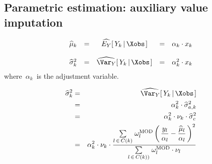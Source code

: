 
\subsection{Parametric estimation: auxiliary value imputation}

\begin{equation*}
\begin{array}{ccccc}
\widehat{\mu}_{k}
& = &
    \widehat{E_{Y}}\!\left[\,Y_{k}\left\vert\,\Xobs\right.\right]
& = &
    \alpha_{k} \cdot x_{k}
\\ \\
\widehat{\sigma}_{k}^{2}
& = &
    \widehat{\Var_{Y}}\!\left[\,Y_{k}\left\vert\,\Xobs\right.\right]
& = &
    \alpha_{k}^{2} \cdot x_{k}
\end{array}
\end{equation*}
where
\,$\alpha_{k}$\, is the adjustment variable.

\begin{eqnarray*}
\widehat{\sigma}_{k}^{2}
& = &
    \widehat{\Var_{Y}}\!\left[\,Y_{k}\left\vert\,\Xobs\right.\right]
\\
& = &
    \alpha_{k}^{2}\cdot\widehat{\sigma}_{a,k}^{2}
\\
& = &
    \alpha_{k}^{2}\cdot\nu_{k}\cdot\widehat{\sigma}_{c}^{2}
\\
& = &
    \alpha_{k}^{2}\cdot\nu_{k}\cdot
    \dfrac{
        \underset{l\,\in\,C(k)}{\sum}\;
        \omega^{\textnormal{MOD}}_{l}
        \left(\,\dfrac{y_{l}}{\alpha_{l}} - \dfrac{\widehat{\mu}_{l}}{\alpha_{l}}\,\right)^{2}
        }{
        \underset{l\,\in\,C(k))}{\sum}\;
        \omega^{\textnormal{MOD}}_{l}\cdot\nu_{l}
        }
\end{eqnarray*}

